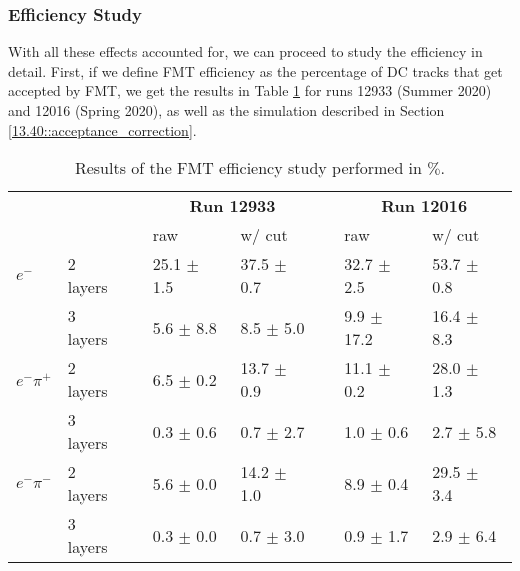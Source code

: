 \subsubsection{Efficiency Study}
\label{14.14::efficiency_study}
    With all these effects accounted for, we can proceed to study the efficiency in detail.
    First, if we define FMT efficiency as the percentage of DC tracks that get accepted by FMT, we get the results in Table \ref{tab::14.14::fmt_efficiency_study} for runs 12933 (Summer 2020) and 12016 (Spring 2020), as well as the simulation described in Section \ref{13.40::acceptance_correction}.

    \begin{table}[b]
        \begin{center}
            \begin{tabularx}{0.88\textwidth}{Xlcllcll}
                \toprule
                & & & \multicolumn{2}{c}{\textbf{Run 12933}} & & \multicolumn{2}{c}{\textbf{Run 12016}} \\
                                    &          & & raw            & w/ cut         & & raw             & w/ cut         \\
                \midrule \midrule
                \textbf{$e^-$}      & 2 layers & & 25.1 $\pm$ 1.5 & 37.5 $\pm$ 0.7 & & 32.7 $\pm$  2.5 & 53.7 $\pm$ 0.8 \\
                                    & 3 layers & &  5.6 $\pm$ 8.8 &  8.5 $\pm$ 5.0 & &  9.9 $\pm$ 17.2 & 16.4 $\pm$ 8.3 \\
                \midrule
                \textbf{$e^-\pi^+$} & 2 layers & &  6.5 $\pm$ 0.2 & 13.7 $\pm$ 0.9 & & 11.1 $\pm$  0.2 & 28.0 $\pm$ 1.3 \\
                                    & 3 layers & &  0.3 $\pm$ 0.6 &  0.7 $\pm$ 2.7 & &  1.0 $\pm$  0.6 &  2.7 $\pm$ 5.8 \\
                \midrule
                \textbf{$e^-\pi^-$} & 2 layers & &  5.6 $\pm$ 0.0 & 14.2 $\pm$ 1.0 & &  8.9 $\pm$  0.4 & 29.5 $\pm$ 3.4 \\
                                    & 3 layers & &  0.3 $\pm$ 0.0 &  0.7 $\pm$ 3.0 & &  0.9 $\pm$  1.7 &  2.9 $\pm$ 6.4 \\
                \bottomrule
            \end{tabularx}
        \end{center}
        \caption[FMT efficiency study results]
        {Results of the FMT efficiency study performed in $\%$.}
        \label{tab::14.14::fmt_efficiency_study}
    \end{table}

